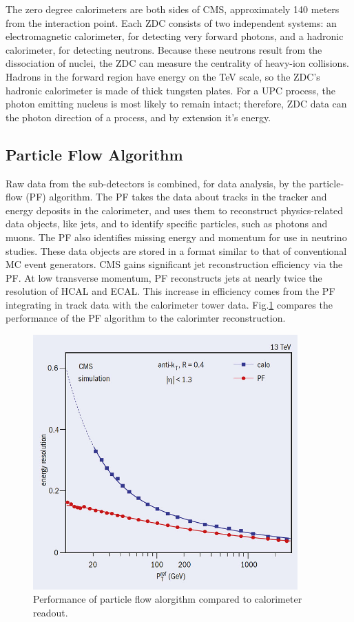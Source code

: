 The zero degree calorimeters are both sides of CMS, approximately 140 meters from the interaction point. Each ZDC consists of two independent systems: an electromagnetic calorimeter, for detecting very forward photons, and a hadronic calorimeter, for detecting neutrons. Because these neutrons result from the dissociation of nuclei, the ZDC can measure the centrality of heavy-ion collisions. Hadrons in the forward region have energy on the TeV scale, so the ZDC's hadronic calorimeter is made of thick tungsten plates. For a UPC process, the photon emitting nucleus is most likely to remain intact; therefore, ZDC data can the photon direction of a process, and by extension it's energy. 

\subsection{Particle Flow Algorithm}

Raw data from the sub-detectors is combined, for data analysis, by the particle-flow (PF) algorithm. The PF takes the data about tracks in the tracker and energy deposits in the calorimeter, and uses them to reconstruct physics-related data objects, like jets, and to identify specific particles, such as photons and muons. The PF also identifies missing energy and momentum for use in neutrino studies. These data objects are stored in a format similar to that of conventional MC event generators. CMS gains significant jet reconstruction efficiency via the PF. At low transverse momentum, PF reconstructs jets at nearly twice the resolution of HCAL and ECAL. This increase in efficiency comes from the PF integrating in track data with the calorimeter tower data. Fig.\ref{fig:pfPerf} compares the performance of the PF algorithm to the calorimter reconstruction.

\begin{figure}[h!]
\begin{centering}
\includegraphics[width=4in]{Chapter3/importfigs/CCrec2_05_16.jpg}
\par\end{centering}
\caption{Performance of particle flow alorgithm compared to calorimeter readout.\label{fig:pfPerf}}
\end{figure}

